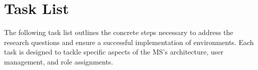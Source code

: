 \begin{enumerate}




\end{enumerate}


\section{Task List}
\label{cha:tasklist}

The following task list outlines the concrete steps necessary to address the research
questions and ensure a successful implementation of environments.
Each task is designed to tackle specific aspects of the MS's
architecture, user management, and role assignments.


